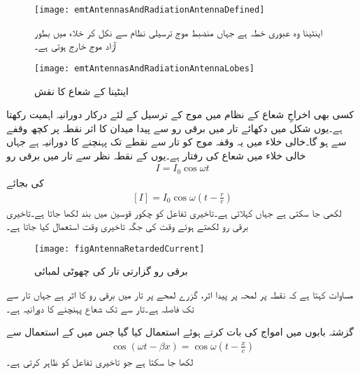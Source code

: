 
\begin{figure}
\centering
\texttt{[image: emtAntennasAndRadiationAntennaDefined]}
\caption{اینٹینا وہ عبوری خطہ ہے جہاں منضبط موج ترسیلی نظام سے نکل کر خلاء میں بطور آزاد موج خارج ہوتی ہے۔}
\label{شکل_اینٹینا_تعارف}
\end{figure}

\begin{figure}
\centering
\texttt{[image: emtAntennasAndRadiationAntennaLobes]}
\caption{اینٹینا کے شعاع کا نقش}
\label{شکل_اینٹینا_شعاع_نقش}
\end{figure}

کسی بھی اخراجِ شعاع کے نظام میں موج کے ترسیل کے لئے درکار دورانیہ اہمیت رکھتا ہے۔یوں شکل  میں دکھائے تار میں برقی رو سے پیدا میدان کا اثر نقطہ  پر کچھ وقفے سے ہو گا۔خالی خلاء میں یہ وقفہ موج کو تار سے نقطے تک پہنچنے کا دورانیہ  ہے جہاں
  خالی خلاء میں  شعاع کی رفتار ہے۔یوں  کے نقطہ نظر سے تار میں برقی رو
\begin{align}
I=I_0 \cos \omega t
\end{align} 
کی بجائے
\begin{align}\label{مساوات_اینٹینا_تاخیری_رو}
[I]=I_0 \cos \omega  \left (t-\frac{r}{c} \right)
\end{align} 
لکھی جا سکتی ہے جہاں   کہلاتی ہے۔تاخیری تفاعل کو چکور قوسین میں بند لکھا جاتا ہے۔تاخیری برقی رو لکھتے ہوئے وقت  کی جگہ تاخیری وقت  استعمال کیا جاتا ہے۔

\begin{figure}
\centering
\texttt{[image: figAntennaRetardedCurrent]}
\caption{برقی رو گزارتی تار کی چھوٹی لمبائی}
\label{شکل_اینٹینا_تاخیری_رو}
\end{figure}

مساوات  کہتا ہے کہ نقطہ  پر لمحہ   پر پیدا اثر،  گزرے  لمحے  پر تار میں برقی رو کا اثر ہے جہاں تار سے  تک فاصلہ  ہے۔تار سے  تک شعاع پہنچنے کا دورانیہ  ہے۔

گزشتہ بابوں میں امواج کی بات کرتے ہوئے  استعمال کیا گیا جس میں  کے استعمال سے
\begin{align}
\cos (\omega t -\beta x)=\cos \omega\left( t- \frac{x}{c}\right)
\end{align}
لکھا جا سکتا ہے  جو تاخیری تفاعل کو ظاہر کرتی ہے۔

